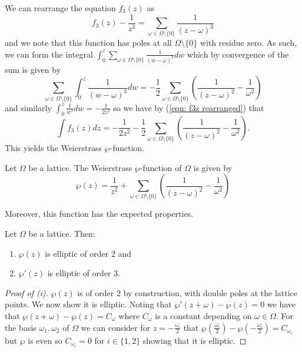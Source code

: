 We can rearrange the equation $f_{3}(z)$ as 
\begin{equation}\label{eqn: f3z rearranged}
    f_{3}(z)-\frac{1}{z^{3}}=\sum_{\omega\in\Omega\setminus\{0\}}\frac{1}{(z-\omega)^{3}}
\end{equation}
and we note that this function has poles at all $\Omega\setminus\{0\}$ with residue zero. As such, we can form the integral $\int_{0}^{z}\sum_{\omega\in\Omega\setminus\{0\}}\frac{1}{(w-\omega)^{3}}dw$ which by convergence of the sum is given by 
$$\sum_{\omega\in\Omega\setminus\{0\}}\int_{0}^{z}\frac{1}{(w-\omega)^{3}}dw=-\frac{1}{2}\sum_{\omega\in\Omega\setminus\{0\}}\left(\frac{1}{(z-\omega)^{2}}-\frac{1}{\omega^{2}}\right)$$
and similarly $\int_{0}^{z}\frac{1}{w^{3}}dw=-\frac{1}{2z^{2}}$ so we have by (\ref{eqn: f3z rearranged}) that 
$$\int f_{3}(z)dz=-\frac{1}{2z^{2}}-\frac{1}{2}\sum_{\omega\in\Omega\setminus\{0\}}\left(\frac{1}{(z-\omega)^{2}}-\frac{1}{\omega^{2}}\right).$$
This yields the Weierstrass $\wp$-function. 
\begin{definition}\label{def: Weierstrass P-function}
    Let $\Omega$ be a lattice. The Weierstrass $\wp$-function of $\Omega$ is given by 
    $$\wp(z)=\frac{1}{z^{2}}+\sum_{\omega\in\Omega\setminus\{0\}}\left(\frac{1}{(z-\omega)^{2}}-\frac{1}{\omega^{2}}\right)$$
\end{definition}
Moreover, this function has the expected properties. 
\begin{proposition}\label{prop: orders of weierstrass P-function}
    Let $\Omega$ be a lattice. Then:
    \begin{enumerate}[label=(\roman*)]
        \item $\wp(z)$ is elliptic of order 2 and 
        \item $\wp'(z)$ is elliptic of order 3. 
    \end{enumerate}
\end{proposition}
\begin{proof}[Proof of (i)]
    $\wp(z)$ is of order 2 by construction, with double poles at the lattice points. We now show it is elliptic. Noting that $\wp'(z+\omega)-\wp(z)=0$ we have that $\wp(z+\omega)-\wp(z)=C_{\omega}$ where $C_{\omega}$ is a constant depending on $\omega\in\Omega$. For the basis $\omega_{1},\omega_{2}$ of $\Omega$ we can consider for $z=-\frac{\omega_{i}}{2}$ that $\wp(\frac{\omega_{i}}{2})-\wp(-\frac{\omega_{i}}{2})=C_{\omega_{i}}$ but $\wp$ is even so $C_{\omega_{i}}=0$ for $i\in\{1,2\}$ showing that it is elliptic. 
\end{proof}
